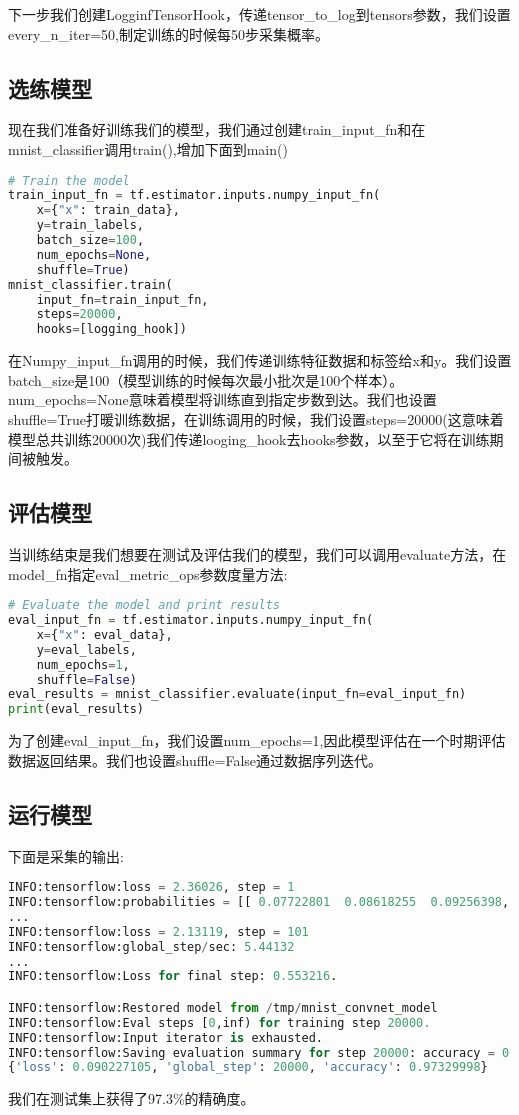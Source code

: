 下一步我们创建LogginfTensorHook，传递tensor\_to\_log到tensors参数，我们设置every\_n\_iter=50,制定训练的时候每50步采集概率。
\subsection{选练模型}
现在我们准备好训练我们的模型，我们通过创建train\_input\_fn和在mnist\_classifier调用train(),增加下面到main()
\begin{lstlisting}[language=Python]
# Train the model
train_input_fn = tf.estimator.inputs.numpy_input_fn(
    x={"x": train_data},
    y=train_labels,
    batch_size=100,
    num_epochs=None,
    shuffle=True)
mnist_classifier.train(
    input_fn=train_input_fn,
    steps=20000,
    hooks=[logging_hook])
\end{lstlisting}
在Numpy\_input\_fn调用的时候，我们传递训练特征数据和标签给x和y。我们设置batch\_size是100（模型训练的时候每次最小批次是100个样本）。num\_epochs=None意味着模型将训练直到指定步数到达。我们也设置shuffle=True打暖训练数据，在训练调用的时候，我们设置steps=20000(这意味着模型总共训练20000次)我们传递looging\_hook去hooks参数，以至于它将在训练期间被触发。
\subsection{评估模型}
当训练结束是我们想要在测试及评估我们的模型，我们可以调用evaluate方法，在model\_fn指定eval\_metric\_ops参数度量方法:
\begin{lstlisting}[language=Python]
# Evaluate the model and print results
eval_input_fn = tf.estimator.inputs.numpy_input_fn(
    x={"x": eval_data},
    y=eval_labels,
    num_epochs=1,
    shuffle=False)
eval_results = mnist_classifier.evaluate(input_fn=eval_input_fn)
print(eval_results)
\end{lstlisting}
为了创建eval\_input\_fn，我们设置num\_epochs=1,因此模型评估在一个时期评估数据返回结果。我们也设置shuffle=False通过数据序列迭代。
\subsection{运行模型}
下面是采集的输出:
\begin{lstlisting}[language=Python]
INFO:tensorflow:loss = 2.36026, step = 1
INFO:tensorflow:probabilities = [[ 0.07722801  0.08618255  0.09256398, ...]]
...
INFO:tensorflow:loss = 2.13119, step = 101
INFO:tensorflow:global_step/sec: 5.44132
...
INFO:tensorflow:Loss for final step: 0.553216.

INFO:tensorflow:Restored model from /tmp/mnist_convnet_model
INFO:tensorflow:Eval steps [0,inf) for training step 20000.
INFO:tensorflow:Input iterator is exhausted.
INFO:tensorflow:Saving evaluation summary for step 20000: accuracy = 0.9733, loss = 0.0902271
{'loss': 0.090227105, 'global_step': 20000, 'accuracy': 0.97329998}
\end{lstlisting}
我们在测试集上获得了97.3\%的精确度。
